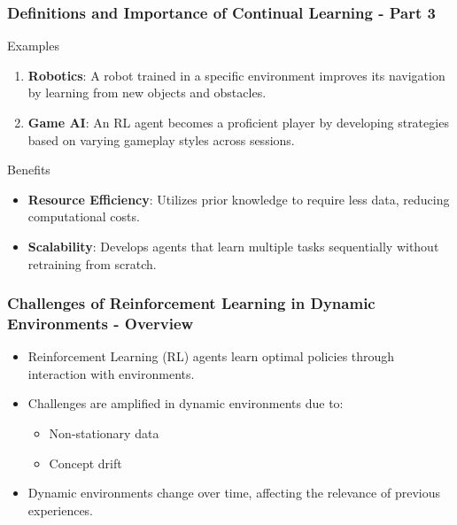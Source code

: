 \documentclass[aspectratio=169]{beamer}
\begin{document}
\begin{frame}[fragile]
    \frametitle{Definitions and Importance of Continual Learning - Part 3}
    \begin{block}{Examples}
        \begin{enumerate}
            \item \textbf{Robotics}: A robot trained in a specific environment improves its navigation by learning from new objects and obstacles.
            \item \textbf{Game AI}: An RL agent becomes a proficient player by developing strategies based on varying gameplay styles across sessions.
        \end{enumerate}
    \end{block}

    \begin{block}{Benefits}
        \begin{itemize}
            \item \textbf{Resource Efficiency}: Utilizes prior knowledge to require less data, reducing computational costs.
            \item \textbf{Scalability}: Develops agents that learn multiple tasks sequentially without retraining from scratch.
        \end{itemize}
    \end{block}
\end{frame}

\begin{frame}[fragile]
    \frametitle{Challenges of Reinforcement Learning in Dynamic Environments - Overview}
    \begin{itemize}
        \item Reinforcement Learning (RL) agents learn optimal policies through interaction with environments.
        \item Challenges are amplified in dynamic environments due to:
        \begin{itemize}
            \item Non-stationary data
            \item Concept drift
        \end{itemize}
        \item Dynamic environments change over time, affecting the relevance of previous experiences.
    \end{itemize}
\end{frame}
\end{document}
